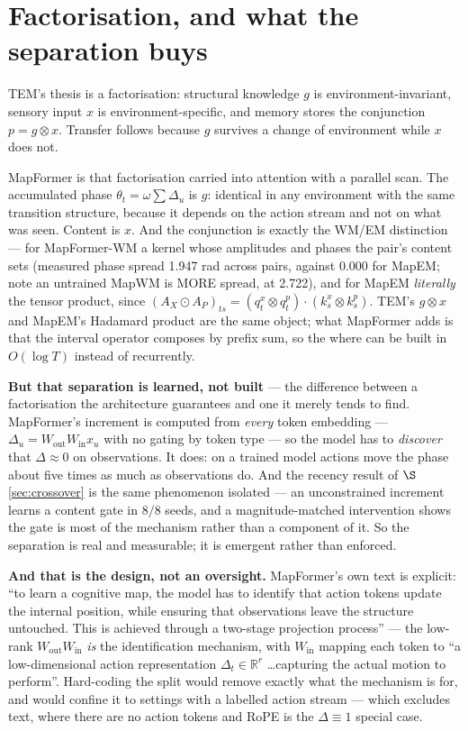 \documentclass[11pt]{article}
\newcommand{\R}{\mathbb{R}}
\begin{document}
\section{Factorisation, and what the separation buys}
\label{sec:factorisation}

TEM's thesis is a factorisation: structural knowledge $g$ is environment-invariant,
sensory input $x$ is environment-specific, and memory stores the conjunction
$p = g \otimes x$. Transfer follows because $g$ survives a change of environment
while $x$ does not.

MapFormer is that factorisation carried into attention
with a parallel scan. The accumulated phase $\theta_t = \omega\sum\Delta_u$ is $g$:
identical in any environment with the same transition structure, because it depends
on the action stream and not on what was seen. Content is $x$. And the conjunction
is exactly the WM/EM distinction --- for MapFormer-WM a kernel whose amplitudes and
phases the pair's content sets (measured phase spread 1.947 rad across pairs, against
0.000 for MapEM; note an untrained MapWM is MORE spread, at 2.722), and
for MapEM \emph{literally} the tensor product, since
$(A_X \odot A_P)_{ts} = (q^x_t \otimes q^p_t)\cdot(k^x_s \otimes k^p_s)$. TEM's
$g \otimes x$ and MapEM's Hadamard product are the same object; what MapFormer adds
is that the interval operator composes by prefix sum, so the where can be built in
$O(\log T)$ instead of recurrently.

\textbf{But that separation is learned, not built} --- the difference between a
factorisation the architecture guarantees and one it merely tends to find.
MapFormer's increment is computed from \emph{every}
token embedding --- $\Delta_u = W_{\mathrm{out}}W_{\mathrm{in}}x_u$ with no gating by
token type --- so the model has to \emph{discover} that $\Delta \approx 0$ on
observations. It does: on a trained model actions move the phase about five times as
much as observations do. And the recency result of $\S$\ref{sec:crossover} is the
same phenomenon isolated --- an unconstrained increment learns a content gate in
$8/8$ seeds, and a magnitude-matched intervention shows the gate is most of the
mechanism rather than a component of it. So the separation is real and measurable;
it is emergent rather than enforced.

\textbf{And that is the design, not an oversight.} MapFormer's own text is explicit:
``to learn a cognitive map, the model has to identify that action tokens update the
internal position, while ensuring that observations leave the structure untouched.
This is achieved through a two-stage projection process'' --- the low-rank
$W_{\mathrm{out}}W_{\mathrm{in}}$ \emph{is} the identification mechanism, with
$W_{\mathrm{in}}$ mapping each token to ``a low-dimensional action representation
$\Delta_t \in \R^r$ \dots capturing the actual motion to perform''. Hard-coding the
split would remove exactly what the mechanism is for, and would confine it to
settings with a labelled action stream --- which excludes text, where there are no
action tokens and RoPE is the $\Delta\equiv1$ special case.
\end{document}
